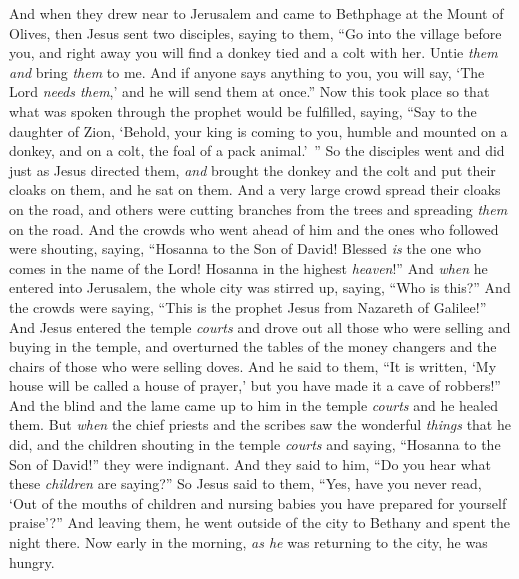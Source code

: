\begin{biblechapter} %
 And when they drew near to Jerusalem and came to Bethphage at the Mount of Olives, then Jesus sent two disciples,
\verse saying to them, “Go into the village before you, and right away you will find a donkey tied and a colt with her. Untie \textit{them} \textit{and} bring \textit{them} to me.
\verse And if anyone says anything to you, you will say, ‘The Lord \textit{needs them},’ and he will send them at once.”
\verse Now this took place so that what was spoken through the prophet would be fulfilled, saying,
\verse “Say to the daughter of Zion, 
‘Behold, your king is coming to you, 
humble and mounted on a donkey, 
and on a colt, the foal of a pack animal.’ ”
\verse So the disciples went and did just as Jesus directed them,
\verse \textit{and} brought the donkey and the colt and put their cloaks on them, and he sat on them.
\verse And a very large crowd spread their cloaks on the road, and others were cutting branches from the trees and spreading \textit{them} on the road.
\verse And the crowds who went ahead of him and the ones who followed were shouting, saying, “Hosanna to the Son of David! 
Blessed \textit{is} the one who comes in the name of the Lord! 
Hosanna in the highest \textit{heaven}!”
\verse And \textit{when} he entered into Jerusalem, the whole city was stirred up, saying, “Who is this?”
\verse And the crowds were saying, “This is the prophet Jesus from Nazareth of Galilee!”
 And Jesus entered the temple \textit{courts} and drove out all those who were selling and buying in the temple, and overturned the tables of the money changers and the chairs of those who were selling doves.
\verse And he said to them, “It is written, ‘My house will be called a house of prayer,’ but you have made it a cave of robbers!”
\verse And the blind and the lame came up to him in the temple \textit{courts} and he healed them.
\verse But \textit{when} the chief priests and the scribes saw the wonderful \textit{things} that he did, and the children shouting in the temple \textit{courts} and saying, “Hosanna to the Son of David!” they were indignant.
\verse And they said to him, “Do you hear what these \textit{children} are saying?” So Jesus said to them, “Yes, have you never read, ‘Out of the mouths of children and nursing babies you have prepared for yourself praise’?”
\verse And leaving them, he went outside of the city to Bethany and spent the night there.
 Now early in the morning, \textit{as he} was returning to the city, he was hungry.

\end{biblechapter}
